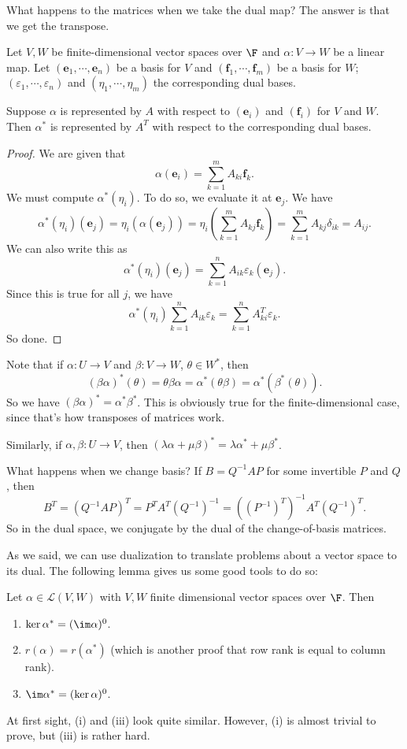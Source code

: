 \documentclass[a4paper]{article}
\begin{document}
What happens to the matrices when we take the dual map? The answer is that we get the transpose.
\begin{prop}
  Let $V, W$ be finite-dimensional vector spaces over $\F$ and $\alpha: V\to W$ be a linear map. Let $(\mathbf{e}_1, \cdots, \mathbf{e}_n)$ be a basis for $V$ and $(\mathbf{f}_1, \cdots, \mathbf{f}_m)$ be a basis for $W$; $(\varepsilon_1, \cdots, \varepsilon_n)$ and $(\eta_1, \cdots, \eta_m)$ the corresponding dual bases.

  Suppose $\alpha$ is represented by $A$ with respect to $(\mathbf{e}_i)$ and $(\mathbf{f}_i)$ for $V$ and $W$. Then $\alpha^*$ is represented by $A^T$ with respect to the corresponding dual bases.
\end{prop}

\begin{proof}
  We are given that
  \[
    \alpha (\mathbf{e}_i) = \sum_{k = 1}^m A_{ki}\mathbf{f}_k.
  \]
  We must compute $\alpha^*(\eta_i)$. To do so, we evaluate it at $\mathbf{e}_j$. We have
  \[
    \alpha^*(\eta_i)(\mathbf{e}_j) = \eta_i(\alpha(\mathbf{e}_j)) = \eta_i\left(\sum_{k = 1}^m A_{kj}\mathbf{f}_k\right) = \sum_{k = 1}^m A_{kj} \delta_{ik} = A_{ij}.
  \]
  We can also write this as
  \[
    \alpha^*(\eta_i)(\mathbf{e}_j) = \sum_{k = 1}^n A_{ik} \varepsilon_k (\mathbf{e}_j).
  \]
  Since this is true for all $j$, we have
  \[
    \alpha^*(\eta_i) \sum_{k = 1}^n A_{ik}\varepsilon_k = \sum_{k = 1}^n A_{ki}^T \varepsilon_k.
  \]
  So done.
\end{proof}

Note that if $\alpha: U\to V$ and $\beta: V\to W$, $\theta \in W^*$, then
\[
  (\beta\alpha)^*(\theta) = \theta\beta\alpha = \alpha^*(\theta\beta) = \alpha^*(\beta^*(\theta)).
\]
So we have $(\beta\alpha)^* = \alpha^*\beta^*$. This is obviously true for the finite-dimensional case, since that's how transposes of matrices work.

Similarly, if $\alpha, \beta: U \to V$, then $(\lambda\alpha + \mu\beta)^* = \lambda\alpha^* + \mu\beta^*$.

What happens when we change basis? If $B = Q^{-1}AP$ for some invertible $P$ and $Q$, then
\[
  B^T = (Q^{-1}AP)^T = P^TA^T(Q^{-1})^{-1} = ((P^{-1})^T)^{-1} A^T (Q^{-1})^T.
\]
So in the dual space, we conjugate by the dual of the change-of-basis matrices.

As we said, we can use dualization to translate problems about a vector space to its dual. The following lemma gives us some good tools to do so:
\begin{lemma}
  Let $\alpha \in \mathcal{L}(V, W)$ with $V, W$ finite dimensional vector spaces over $\F$. Then
  \begin{enumerate}
    \item $\ker \alpha^* = (\im \alpha)^0$.
    \item $r(\alpha) = r(\alpha^*)$ (which is another proof that row rank is equal to column rank).
    \item $\im \alpha^* = (\ker \alpha)^0$.
  \end{enumerate}
\end{lemma}
At first sight, (i) and (iii) look quite similar. However, (i) is almost trivial to prove, but (iii) is rather hard.
\end{document}
